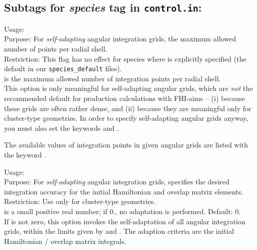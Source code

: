\newpage

\subsection*{Subtags for \emph{species} tag in \texttt{control.in}:}

{
  \noindent
  Usage:   \\[1.0ex]
  Purpose: For \emph{self-adapting} angular integration grids, the
    maximum allowed number of points per radial shell. \\[1.0ex]
  Restriction: This flag has no effect for species where
     is explicitly specified (the default in
    our \texttt{species\_default} files). \\[1.0ex]
   is the maximum allowed number of integration points
    per radial shell. \\
}
This option is only meaningful for self-adapting angular grids, which
are \emph{not} the recommended default for production calculations
with FHI-aims -- (i) because these grids are often rather dense, and
(ii) because they are meaningful only for cluster-type geometries. In 
order to specify self-adapting angular grids anyway, you must also set
the keywords  and
.  

The available values of integration points in given angular grids are
listed with the keyword . 

{
  \noindent 
  Usage:  
    \\[1.0ex]
  Purpose: For \emph{self-adapting} angular integration grids,
    specifies the desired integration accuracy for the initial 
    Hamiltonian and overlap matrix elements. \\[1.0ex]
  Restriction: Use only for cluster-type geometries. \\[1.0ex]
   is a small positive real number; if 0., no
    adaptation is performed. Default: 0. \\
}
If  is not zero, this option invokes the
self-adaptation of all angular integration grids, within the limits
given by  and
. The adaption criteria are the initial 
Hamiltonian / overlap matrix integrals. 

